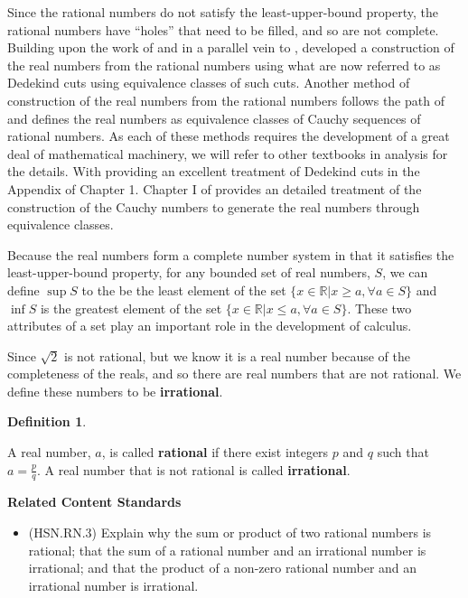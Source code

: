 \documentclass[
]{book}
\providecommand{\tightlist}{%
  \setlength{\itemsep}{0pt}\setlength{\parskip}{0pt}}
\newenvironment{standards}{}{}
\theoremstyle{definition}
\newtheorem{definition}{Definition}[chapter]
\theoremstyle{definition}
\theoremstyle{definition}
\theoremstyle{definition}
\theoremstyle{remark}
\begin{document}
Since the rational numbers do not satisfy the least-upper-bound property, the rational numbers have ``holes'' that need to be filled, and so are not complete. Building upon the work of \citet{bertrand1840} and in a parallel vein to \citet{Heine1872}, \citet{Dedekind1872} developed a construction of the real numbers from the rational numbers using what are now referred to as Dedekind cuts using equivalence classes of such cuts. Another method of construction of the real numbers from the rational numbers follows the path of \citet{Cauchy1821} and defines the real numbers as equivalence classes of Cauchy sequences of rational numbers. As each of these methods requires the development of a great deal of mathematical machinery, we will refer to other textbooks in analysis for the details. With \citet{Rudin1976} providing an excellent treatment of Dedekind cuts in the Appendix of Chapter 1. Chapter I of \citet{Thurston1956} provides an detailed treatment of the construction of the Cauchy numbers to generate the real numbers through equivalence classes.

Because the real numbers form a complete number system in that it satisfies the least-upper-bound property, for any bounded set of real numbers, \(S\), we can define \(\sup S\) to the be the least element of the set \(\{ x \in \mathbb{R} \vert x\geq a, \forall a\in S\}\) and \(\inf S\) is the greatest element of the set \(\{x\in \mathbb{R} \vert x\leq a, \forall a\in S\}\). These two attributes of a set play an important role in the development of calculus.

Since \(\sqrt{2}\) is not rational, but we know it is a real number because of the completeness of the reals, and so there are real numbers that are not rational. We define these numbers to be \textbf{irrational}.

\begin{definition}
\protect\hypertarget{def:unlabeled-div-52}{}\label{def:unlabeled-div-52}

A real number, \(a\), is called \textbf{rational} if there exist integers \(p\) and \(q\) such that \(a=\frac{p}{q}\). A real number that is not rational is called \textbf{irrational}.

\end{definition}

\begin{standards}

\begin{center}
\textbf{Related Content Standards}

\end{center}

\begin{itemize}
\tightlist
\item
  (HSN.RN.3) Explain why the sum or product of two rational numbers is rational; that the sum of a rational number and an irrational number is irrational; and that the product of a non-zero rational number and an irrational number is irrational.
\end{itemize}

\end{standards}
\end{document}
